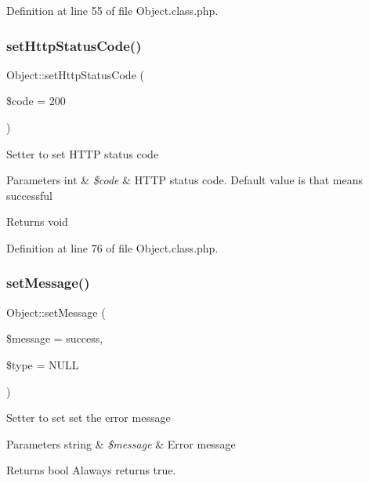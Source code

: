 Definition at line 55 of file Object.\+class.\+php.

\mbox{\label{classObject_a876fabaa6dba9f8bcc53ef04eb7f3784}} 
\subsubsection{\texorpdfstring{set\+Http\+Status\+Code()}{setHttpStatusCode()}}
{\footnotesize\ttfamily Object\+::set\+Http\+Status\+Code (\begin{DoxyParamCaption}\item[{}]{\$code = {\ttfamily \textquotesingle{}200\textquotesingle{}} }\end{DoxyParamCaption})}

Setter to set H\+T\+TP status code


\begin{DoxyParams}[1]{Parameters}
int & {\em \$code} & H\+T\+TP status code. Default value is {} that means successful \\
\hline
\end{DoxyParams}
\begin{DoxyReturn}{Returns}
void 
\end{DoxyReturn}


Definition at line 76 of file Object.\+class.\+php.

\mbox{\label{classObject_aecb43fbc87ff3edfda11eb5d8abc814e}} 
\subsubsection{\texorpdfstring{set\+Message()}{setMessage()}}
{\footnotesize\ttfamily Object\+::set\+Message (\begin{DoxyParamCaption}\item[{}]{\$message = {\ttfamily \textquotesingle{}success\textquotesingle{}},  }\item[{}]{\$type = {\ttfamily NULL} }\end{DoxyParamCaption})}

Setter to set set the error message


\begin{DoxyParams}[1]{Parameters}
string & {\em \$message} & Error message \\
\hline
\end{DoxyParams}
\begin{DoxyReturn}{Returns}
bool Alaways returns true. 
\end{DoxyReturn}


